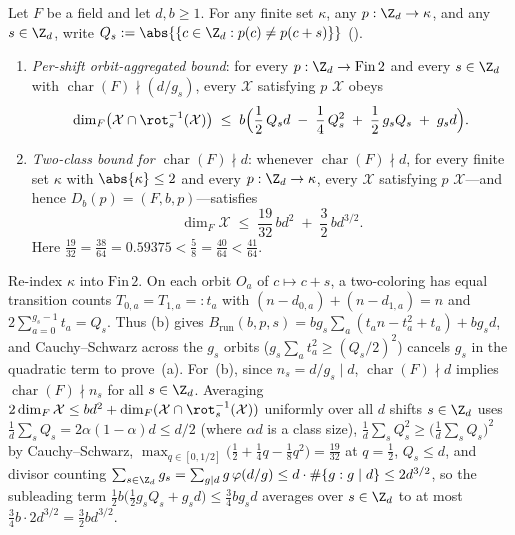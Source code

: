 \begin{theorem}\label{thm:1b-two-class}
Let $F$ be a field and let $d, b \ge 1$. For any finite set $\kappa$, any $p : \Z_d \to \kappa$, and
any $s \in \Z_d$, write $Q_s := \abs{\{c \in \Z_d : p(c) \ne p(c + s)\}}$
().
\begin{enumerate}[label=(\alph*)]
\item \emph{Per-shift orbit-aggregated bound}: for every $p : \Z_d \to \mathrm{Fin}\,2$ and every
  $s \in \Z_d$ with $\operatorname{char}(F) \nmid (d / g_s)$, every $\mathcal{X}$ satisfying
   $p$ $\mathcal{X}$ obeys
  \[
    \dim_F\bigl(\mathcal{X} \cap \rot_s^{-1}(\mathcal{X})\bigr)
    \;\le\;
    b\Bigl(\frac{1}{2}\,Q_s d \;-\; \frac{1}{4}\,Q_s^2 \;+\; \frac{1}{2}\,g_s Q_s \;+\; g_s d\Bigr).
  \]
\item \emph{Two-class bound for $\operatorname{char}(F) \nmid d$}: whenever
  $\operatorname{char}(F) \nmid d$, for every finite set $\kappa$ with $\abs{\kappa} \le 2$ and every
  $p : \Z_d \to \kappa$, every $\mathcal{X}$ satisfying  $p$
  $\mathcal{X}$---and hence $D_b(p) = {}$$(F, b, p)$---satisfies
  \[
    \dim_F \mathcal{X}
    \;\le\;
    \frac{19}{32}\,b d^2 \;+\; \frac{3}{2}\,b d^{3/2}.
  \]
  Here $\frac{19}{32} = \frac{38}{64} = 0.59375 < \frac{5}{8} = \frac{40}{64} < \frac{41}{64}$.
\end{enumerate}
\end{theorem}
\begin{outline}
Re-index $\kappa$ into $\mathrm{Fin}\,2$. On each orbit $O_a$ of $c \mapsto c + s$, a two-coloring has
equal transition counts $T_{0,a} = T_{1,a} =: t_a$ with $(n - d_{0,a}) + (n - d_{1,a}) = n$ and
$2\sum_{a=0}^{g_s - 1} t_a = Q_s$. Thus (b) gives
$B_{\mathrm{run}}(b, p, s) = b g_s \sum_a (t_a n - t_a^2 + t_a) + b g_s d$, and Cauchy--Schwarz across
the $g_s$ orbits ($g_s \sum_a t_a^2 \ge (Q_s/2)^2$) cancels $g_s$ in the quadratic term to prove~(a).
For~(b), since $n_s = d / g_s \mid d$, $\operatorname{char}(F) \nmid d$ implies
$\operatorname{char}(F) \nmid n_s$ for all $s \in \Z_d$. Averaging
$2\dim_F \mathcal{X} \le b d^2 + \dim_F(\mathcal{X} \cap \rot_s^{-1}(\mathcal{X}))$ uniformly over all
$d$ shifts $s \in \Z_d$ uses $\frac{1}{d}\sum_s Q_s = 2\alpha(1 - \alpha)d \le d/2$ (where $\alpha d$
is a class size), $\frac{1}{d}\sum_s Q_s^2 \ge \bigl(\frac{1}{d}\sum_s Q_s\bigr)^2$ by Cauchy--Schwarz,
$\max_{q \in [0, 1/2]}\bigl(\frac{1}{2} + \frac{1}{4}q - \frac{1}{8}q^2\bigr) = \frac{19}{32}$ at
$q = \frac{1}{2}$, $Q_s \le d$, and divisor counting
$\sum_{s \in \Z_d} g_s = \sum_{g \mid d} g\,\varphi(d/g) \le d \cdot \#\{g : g \mid d\} \le 2 d^{3/2}$,
so the subleading term $\frac{1}{2}b\bigl(\frac{1}{2} g_s Q_s + g_s d\bigr) \le \frac{3}{4} b g_s d$
averages over $s \in \Z_d$ to at most $\frac{3}{4} b \cdot 2 d^{3/2} = \frac{3}{2} b d^{3/2}$.
\end{outline}

